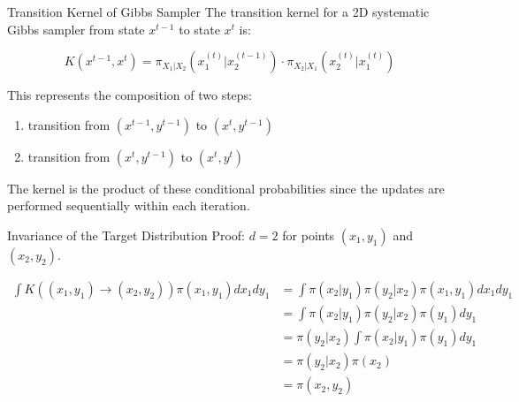 \begin{frame}{Transition Kernel of Gibbs Sampler}
    The transition kernel for a 2D systematic Gibbs sampler from state $x^{t-1}$ to state $x^{t}$ is:

    \begin{equation*}
        K(x^{t-1}, x^{t}) = \pi_{X_1|X_2} (x_1^{(t)}|x_2^{(t-1)}) \cdot \pi_{X_2|X_1}(x_2^{(t)}|x_1^{(t)})
    \end{equation*}

    \vspace{0.5cm}
    This represents the composition of two steps:
    \begin{enumerate}
        \item transition from $(x^{t-1},y^{t-1})$ to $(x^{t},y^{t-1})$
        \item transition from $(x^{t},y^{t-1})$ to $(x^{t},y^{t})$
    \end{enumerate}

    \vspace{0.5cm}
    The kernel is the product of these conditional probabilities since the updates are performed sequentially within each iteration.
\end{frame}

\begin{frame}{Invariance of the Target Distribution }
    Proof: $d=2$ for points $(x_1,y_1)$ and $(x_2,y_2)$.

    \begin{align}
    \int K((x_1,y_1) \to (x_2,y_2))\pi(x_1,y_1)dx_1 dy_1 &= \int \pi(x_2 | y_1)\pi(y_2 | x_2)\pi(x_1, y_1)dx_1 dy_1 \\
    &= \int \pi(x_2 | y_1)\pi(y_2 | x_2)\pi(y_1)dy_1 \\
    &= \pi(y_2 | x_2) \int \pi(x_2 | y_1)\pi(y_1)dy_1 \\
    &= \pi(y_2 | x_2)\pi(x_2) \\
    &= \pi(x_2, y_2) \quad
    \end{align}
\end{frame}



